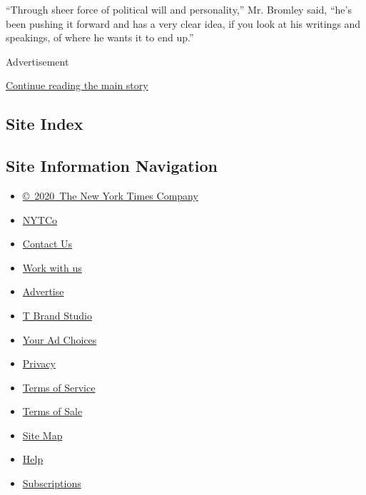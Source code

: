 ``Through sheer force of political will and personality,'' Mr. Bromley
said, ``he's been pushing it forward and has a very clear idea, if you
look at his writings and speakings, of where he wants it to end up.''

Advertisement

\protect\hyperlink{after-bottom}{Continue reading the main story}

\hypertarget{site-index}{%
\subsection{Site Index}\label{site-index}}

\hypertarget{site-information-navigation}{%
\subsection{Site Information
Navigation}\label{site-information-navigation}}

\begin{itemize}
\tightlist
\item
  \href{https://help.nytimes3xbfgragh.onion/hc/en-us/articles/115014792127-Copyright-notice}{©~2020~The
  New York Times Company}
\end{itemize}

\begin{itemize}
\tightlist
\item
  \href{https://www.nytco.com/}{NYTCo}
\item
  \href{https://help.nytimes3xbfgragh.onion/hc/en-us/articles/115015385887-Contact-Us}{Contact
  Us}
\item
  \href{https://www.nytco.com/careers/}{Work with us}
\item
  \href{https://nytmediakit.com/}{Advertise}
\item
  \href{http://www.tbrandstudio.com/}{T Brand Studio}
\item
  \href{https://www.nytimes3xbfgragh.onion/privacy/cookie-policy\#how-do-i-manage-trackers}{Your
  Ad Choices}
\item
  \href{https://www.nytimes3xbfgragh.onion/privacy}{Privacy}
\item
  \href{https://help.nytimes3xbfgragh.onion/hc/en-us/articles/115014893428-Terms-of-service}{Terms
  of Service}
\item
  \href{https://help.nytimes3xbfgragh.onion/hc/en-us/articles/115014893968-Terms-of-sale}{Terms
  of Sale}
\item
  \href{https://spiderbites.nytimes3xbfgragh.onion}{Site Map}
\item
  \href{https://help.nytimes3xbfgragh.onion/hc/en-us}{Help}
\item
  \href{https://www.nytimes3xbfgragh.onion/subscription?campaignId=37WXW}{Subscriptions}
\end{itemize}
